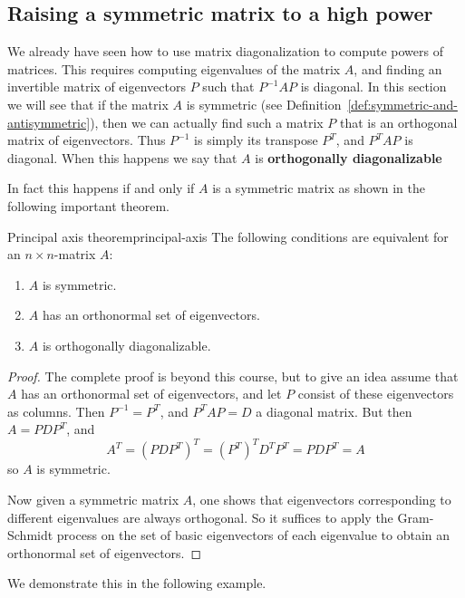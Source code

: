 \subsection{Raising a symmetric matrix to a high power}

We already have seen how to use matrix diagonalization to compute
powers of matrices. This requires computing eigenvalues of the matrix
$A$, and finding an invertible matrix of eigenvectors $P$ such that
$P^{-1}AP$ is diagonal. In this section we will see that if the matrix
$A$ is symmetric (see Definition~\ref{def:symmetric-and-antisymmetric}),
then we can actually find such a matrix $P$ that is an orthogonal
matrix of eigenvectors. Thus $P^{-1}$ is simply its transpose
$P^T$, and $P^TAP$ is diagonal. When this happens we say that $A$ is
\textbf{orthogonally diagonalizable}

In fact this happens if and only if $A$ is a symmetric matrix as
shown in the following important theorem.

\begin{theorem}{Principal axis theorem}{principal-axis}
The following conditions are equivalent for an $n \times n$-matrix $A$:
\begin{enumerate}
\item $A$ is symmetric. 
\item $A$ has an orthonormal set of eigenvectors. 
\item $A$ is  orthogonally diagonalizable.
\end{enumerate}
\end{theorem}

\begin{proof}
The complete proof is beyond this course, but to give an idea assume
that $A$ has an orthonormal set of eigenvectors, and let $P$ consist
of these eigenvectors as columns. Then $P^{-1}=P^T$, and $P^TAP=D$ a diagonal matrix. But then $A=PDP^T$, and
\[ A^T=(PDP^T)^T = (P^T)^TD^TP^T=PDP^T=A\]
so $A$ is symmetric. 

Now given a symmetric matrix $A$, one shows that eigenvectors
corresponding to different eigenvalues are always orthogonal. So it
suffices to apply the Gram-Schmidt process on the set of basic
eigenvectors of each eigenvalue to obtain an orthonormal set of eigenvectors. 
\end{proof}

We demonstrate this in the following example. 

